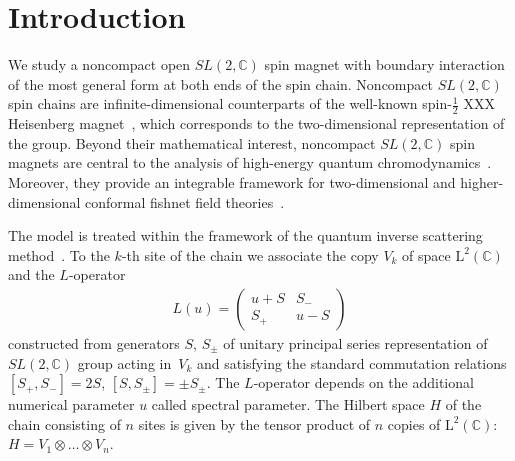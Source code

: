 \documentclass[a4paper,11pt]{article}
\numberwithin{equation}{section}
\begin{document}
\newpage

 \tableofcontents


 \newpage


\section{Introduction}

We study a noncompact open $SL(2,\mathbb{C})$ spin magnet with boundary interaction~\cite{Skl:Boundary,Ch} of the most general form at both ends of the spin chain.
Noncompact $SL(2,\mathbb{C})$ spin chains are infinite-dimensional counterparts of the well-known spin-$\frac{1}{2}$ XXX Heisenberg magnet~\cite{TaFa,KulSk,Fad:BetheAns}, which corresponds to the two-dimensional representation of the group.
Beyond their mathematical interest, noncompact $SL(2,\mathbb{C})$ spin magnets are central to the analysis of high-energy quantum chromodynamics~\cite{DKM,L0,L1,L2,FK}. Moreover, they provide an integrable framework for two-dimensional and higher-dimensional conformal fishnet field theories~\cite{KO,DKO,DO1,DO2,DO3,Oliv,O1,O2,GKK,KG,GGKK,GKKNS,CK,BCF,BD,BD1,DFO,Duhr2,AO,AFKO,KO1}.

The model is treated within the framework of the quantum inverse scattering method~\cite{Skl91,Fad:BetheAns,FST,KulSk,TaFa}.
To the $k$-th site of the chain we associate the copy $V_k$ of space $\mathrm{L}^2(\mathbb{C})$ and the $L$-operator
\begin{align*}
	L(u) =
	\left (\begin{array}{cc}
		u + S & S_{-} \\
		S_{+} & u - S \end{array} \right )
\end{align*}
constructed from generators $S,\,S_\pm$ of unitary principal series representation of $SL(2,\mathbb{C})$ group acting in~$V_k$ and satisfying the standard commutation relations $[S_+,S_-]=2S$, $[S,S_\pm]=\pm S_\pm$.
The $L$-operator depends on the additional numerical parameter $u$ called spectral parameter.
The Hilbert space $H$ of the chain consisting of $n$ sites is given by the tensor product of $n$ copies of $\mathrm{L}^2(\mathbb{C})$: $H=V_1\otimes\ldots\otimes V_n$.
\end{document}
